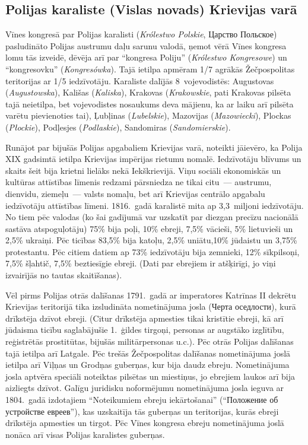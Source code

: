 \documentclass[twoside,a5paper,12pt,fleqn,openany]{extbook}
\newcommand{\pltxti}[1]{\textit{\textpolish{#1}}}
\newcommand{\rutxti}[1]{\textrussian{#1}}
\begin{document}
\subsection{Polijas karaliste (Vislas novads) Krievijas varā}

Vīnes kongresā par Polijas karalisti (\pltxti{Królestwo Polskie}, \rutxti{Царство Польское}) pasludināto Polijas austrumu daļu sarunu valodā, ņemot vērā Vīnes kongresa lomu tās izveidē, dēvēja arī par ``kongresa Poliju'' (\pltxti{Królestwo Kongresowe}) un ``kongresovku'' (\pltxti{Kongresówka}). Tajā ietilpa apmēram 1/7 agrākās Žečpospolitas teritorijas ar 1/5 iedzīvotāju. Karaliste dalījās 8~vojevodistēs: Augustovas (\pltxti{Augustowska}), Kališas (\pltxti{Kaliska}), Krakovas (\pltxti{Krakowskie}, pati Krakovas pilsēta tajā neietilpa, bet vojevodistes nosaukums deva mājienu, ka ar laiku arī pilsēta varētu pievienoties tai), Ļubļinas (\pltxti{Lubelskie}), Mazovijas (\pltxti{Mazowiecki}), Plockas (\pltxti{Płockie}), Podļesjes (\pltxti{Podlaskie}), Sandomiras (\pltxti{Sandomierskie}).

Runājot par bijušās Polijas apgabaliem Krievijas varā, noteikti jāievēro, ka Polija XIX gadsimtā ietilpa Krievijas impērijas rietumu nomalē. Iedzīvotāju blīvums un skaits šeit bija krietni lielāks nekā Iekškrievijā. Viņu sociāli ekonomiskās un kultūras attīstības līmenis redzami pārsniedza ne tikai citu~--- austrumu, dienvidu, ziemeļu~--- valsts nomaļu, bet arī Krievijas centrālo apgabalu iedzīvotāju attīstības līmeni. 1816.~gadā karalistē mita ap 3,3~miljoni iedzīvotāju. No tiem pēc valodas (ko šai gadījumā var uzskatīt par diezgan precīzu nacionālā sastāva atspoguļotāju) 75\% bija poļi, 10\% ebreji, 7,5\% vācieši, 5\% lietuvieši un 2,5\% ukraiņi. Pēc ticības 83,5\% bija katoļu, 2,5\% uniātu,10\% jūdaistu un 3,75\% protestantu. Pēc citiem datiem ap 73\% iedzīvotāju bija zemnieki, 12\% sīkpilsoņi, 7,5\% šļahtič, 7,5\% beztiesīgie ebreji. (Dati par ebrejiem ir atšķirīgi, jo viņi izvairījās no tautas skaitīšanas).

Vēl pirms Polijas otrās dalīšanas 1791.~gadā ar imperatores Katrīnas II dekrētu Krievijas teritorijā tika izsludināta nometinājuma josla (\rutxti{Черта оседлости}), kurā drīkstēja dzīvot ebreji. (Citur drīkstēja apmesties tikai kristītie ebreji, kā arī jūdaisma ticību saglabājušie 1.~ģildes tirgoņi, personas ar augstāko izglītību, reģistrētās prostitūtas, bijušās militārpersonas u.c.). Pēc otrās Polijas dalīšanas tajā ietilpa arī Latgale. Pēc trešās Žečpospolitas dalīšanas nometinājuma joslā ietilpa arī Viļņas un Grodņas guberņas, kur bija daudz ebreju. Nometinājuma josla aptvēra speciāli noteiktas pilsētas un miestiņus, jo ebrejiem laukos arī bija aizliegts dzīvot. Galīgu juridisku noformējumu nometinājuma josla ieguva ar 1804.~gadā izdotajiem ``Noteikumiem ebreju iekārtošanai'' (``\rutxti{Положение об устройстве евреев}''), kas uzskaitīja tās guberņas un teritorijas, kurās ebreji drīkstēja apmesties un tirgot. Pēc Vīnes kongresa ebreju nometinājuma joslā nonāca arī visas Polijas karalistes guberņas.
\end{document}
